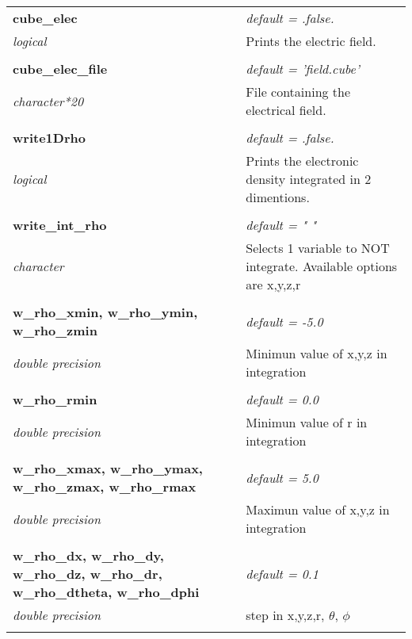 \begin{Spacing}{1.0}
\begin{longtable}{ p{} p{} }
   \textbf{cube\_elec}
   &  \textit{default = .false. }
   \\*\textit{logical}
   & Prints the electric field.\\* \\

   \textbf{cube\_elec\_file}
   &  \textit{default = 'field.cube'}
   \\*\textit{character*20}
   & File containing the electrical field.\\* \\

   \textbf{write1Drho}
   &  \textit{default = .false.}
   \\*\textit{logical}
   & Prints the electronic density integrated in 2 dimentions.\\* \\
   
   \textbf{write\_int\_rho}
   &  \textit{default = " "}
   \\*\textit{character}
   & Selects 1 variable to NOT integrate. Available options are x,y,z,r\\* \\
   
   \textbf{w\_rho\_xmin, w\_rho\_ymin, w\_rho\_zmin}
   &  \textit{default = -5.0}
   \\*\textit{double precision}
   & Minimun value of x,y,z in integration\\* \\
   
   \textbf{w\_rho\_rmin}
   &  \textit{default = 0.0}
   \\*\textit{double precision}
   & Minimun value of r in integration\\* \\   
   
   \textbf{w\_rho\_xmax, w\_rho\_ymax, w\_rho\_zmax, w\_rho\_rmax}
   &  \textit{default = 5.0}
   \\*\textit{double precision}
   & Maximun value of x,y,z in integration\\* \\
   
   \textbf{w\_rho\_dx,  w\_rho\_dy, w\_rho\_dz, w\_rho\_dr, w\_rho\_dtheta, w\_rho\_dphi}
   &  \textit{default = 0.1}
   \\*\textit{double precision}
   & step in x,y,z,r, $\theta$, $\phi$ \\* \\

 
                  
\end{longtable}
\end{Spacing}
